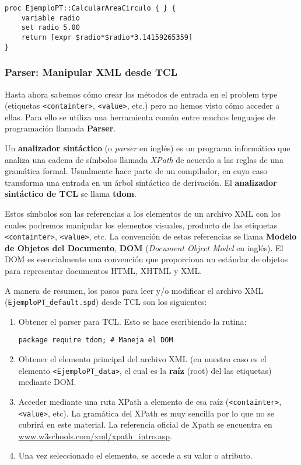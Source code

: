 \documentclass[10pt, a4paper, twocolumn]{article}
\begin{document}
\lstset{language=tcl} 
\begin{lstlisting}[caption={Función que calcula el área de un círculo.}]
proc EjemploPT::CalcularAreaCirculo { } {
	variable radio	
	set radio 5.00
	return [expr $radio*$radio*3.14159265359]
}
\end{lstlisting}

\subsubsection{Parser: Manipular XML desde TCL}

Hasta ahora sabemos cómo crear los métodos de entrada en el problem type (etiquetas \texttt{<containter>}, \texttt{<value>}, etc.) pero no hemos visto cómo acceder a ellas. Para ello se utiliza una herramienta común entre muchos lenguajes de programación llamada \textbf{Parser}.

Un \textbf{analizador sintáctico} (o \textit{parser} en inglés) es un programa informático que analiza una cadena de símbolos llamada \textit{XPath} de acuerdo a las reglas de una gramática formal. Usualmente hace parte de un compilador, en cuyo caso transforma una entrada en un árbol sintáctico de derivación. El \textbf{analizador sintáctico de TCL} se llama \textbf{tdom}.

Estos símbolos son las referencias a los elementos de un archivo XML con los cuales podremos manipular los elementos visuales, producto de las etiquetas \texttt{<containter>}, \texttt{<value>}, etc. La convención de estas referencias se llama \textbf{Modelo de Objetos del Documento}, \textbf{DOM} (\textit{Document Object Model} en inglés). El DOM es esencialmente una convención que proporciona un estándar de objetos para representar documentos HTML, XHTML y XML.

A manera de resumen, los pasos para leer y/o modificar el archivo XML (\texttt{EjemploPT\_default.spd}) desde TCL son los siguientes:

\begin{enumerate}
	\item Obtener el parser para TCL. Esto se hace escribiendo la rutina:
	\begin{lstlisting}[caption={Instrucción para obtener el parser para TCL.}]
	package require tdom; # Maneja el DOM
	\end{lstlisting}
	\item Obtener el elemento principal del archivo XML (en nuestro caso es el elemento \texttt{<EjemploPT\_data>}, el cual es la \textbf{raíz} (root) del las etiquetas) mediante DOM.
	\item Acceder mediante una ruta XPath a elemento de esa raíz (\texttt{<containter>}, \texttt{<value>}, etc). La gramática del XPath es muy sencilla por lo que no se cubrirá en este material. La referencia oficial de Xpath se encuentra en \textcolor{BlueGiD}{\underline{\url{www.w3schools.com/xml/xpath_intro.asp}}}.
	\item Una vez seleccionado el elemento, se accede a su valor o atributo.
\end{enumerate}
\end{document}
